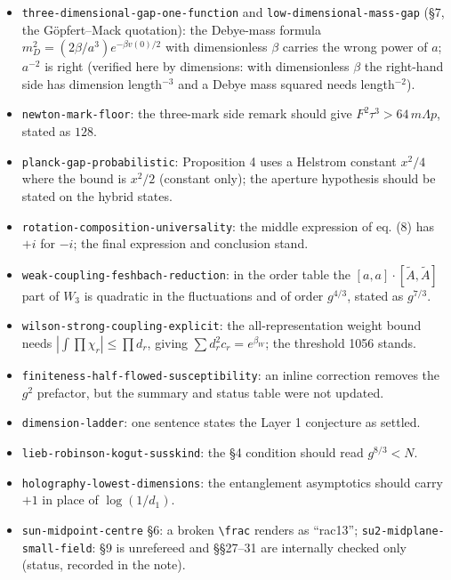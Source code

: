 \documentclass[11pt,a4paper]{article}
\newcommand{\tightlist}{\setlength{\itemsep}{0pt}\setlength{\parskip}{0pt}}
\begin{document}
\begin{itemize}
\tightlist
\item
  \texttt{three-dimensional-gap-one-function} and
  \texttt{low-dimensional-mass-gap} (§7, the Göpfert--Mack quotation):
  the Debye-mass formula \(m_D^2=(2\beta/a^3)e^{-\beta v(0)/2}\) with
  dimensionless \(\beta\) carries the wrong power of \(a\); \(a^{-2}\)
  is right (verified here by dimensions: with dimensionless \(\beta\)
  the right-hand side has dimension length\(^{-3}\) and a Debye mass
  squared needs length\(^{-2}\)).
\item
  \texttt{newton-mark-floor}: the three-mark side remark should give
  \(F^2\tau^3>64\,m\Lambda p\), stated as \(128\).
\item
  \texttt{planck-gap-probabilistic}: Proposition 4 uses a Helstrom
  constant \(x^2/4\) where the bound is \(x^2/2\) (constant only); the
  aperture hypothesis should be stated on the hybrid states.
\item
  \texttt{rotation-composition-universality}: the middle expression of
  eq. (8) has \(+i\) for \(-i\); the final expression and conclusion
  stand.
\item
  \texttt{weak-coupling-feshbach-reduction}: in the order table the
  \([a,a]\cdot[\tilde A,\tilde A]\) part of \(W_3\) is quadratic in the
  fluctuations and of order \(g^{4/3}\), stated as \(g^{7/3}\).
\item
  \texttt{wilson-strong-coupling-explicit}: the all-representation
  weight bound needs \(|\int\prod\chi_r|\le\prod d_r\), giving
  \(\sum d_r^2c_r=e^{\beta_W}\); the threshold 1056 stands.
\item
  \texttt{finiteness-half-flowed-susceptibility}: an inline correction
  removes the \(g^2\) prefactor, but the summary and status table were
  not updated.
\item
  \texttt{dimension-ladder}: one sentence states the Layer 1 conjecture
  as settled.
\item
  \texttt{lieb-robinson-kogut-susskind}: the §4 condition should read
  \(g^{8/3}<N\).
\item
  \texttt{holography-lowest-dimensions}: the entanglement asymptotics
  should carry \(+1\) in place of \(\log(1/d_1)\).
\item
  \texttt{sun-midpoint-centre} §6: a broken
  \texttt{\textbackslash{}frac} renders as ``rac13'';
  \texttt{su2-midplane-small-field}: §9 is unrefereed and §§27--31 are
  internally checked only (status, recorded in the note).
\end{itemize}
\end{document}
